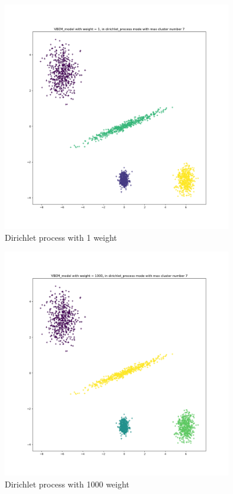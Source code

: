\documentclass{article}
\theoremstyle{definition}
\numberwithin{equation}{section}
\numberwithin{figure}{section}
\begin{document}
\begin{figure}[htbp]
	\centering
	\includegraphics[width=10cm]{problem3/VBEM/w:1t:dirichlet_process.png}
\caption{Dirichlet process with 1 weight}
\label{w:1t:dirichlet_process}
\end{figure}

\begin{figure}[htbp]
	\centering
	\includegraphics[width=10cm]{problem3/VBEM/w:1000t:dirichlet_process.png}
\caption{Dirichlet process with 1000 weight}
\label{w:1000t:dirichlet_process}
\end{figure}

\hspace{2mm}


\end{document}
